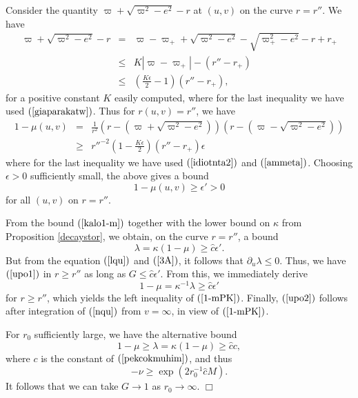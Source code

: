 \documentclass{article}
\begin{document}
Consider the quantity $\varpi+\sqrt{\varpi^2-e^2}-r$
at $(u,v)$ on the curve $r=r''$.
We have
\begin{eqnarray}
\nonumber
\label{ammeta}
\varpi+\sqrt{\varpi^2-e^2}-r	& = &	\varpi-\varpi_++\sqrt{\varpi^2-e^2}-\sqrt{\varpi_+^2-e^2}-r+r_+\\
				&\le&	K|\varpi-\varpi_+|-(r''-r_+)\\
				&\le&	\left(\frac{K\epsilon}2-1\right)(r''-r_+),
\end{eqnarray}
for a positive constant $K$ easily computed,
where for the last inequality we have used $(\ref{giaparakatw})$.
Thus for $r(u,v)=r''$, we have
\begin{eqnarray*}
1-\mu(u,v)	& = &	\frac{1}{r^2}\left(r-\left(\varpi+\sqrt{\varpi^2-e^2}\right)\right)
					\left(r-\left(\varpi-\sqrt{\varpi^2-e^2}\right)\right)\\
		&\ge&	r''^{-2}\left(1-\frac{K\epsilon}2\right)(r''-r_+)\epsilon
\end{eqnarray*}
where for the last inequality we have used $(\ref{idiotnta2})$ and $(\ref{ammeta})$.
Choosing $\epsilon>0$ sufficiently small, the above gives a bound
\begin{equation}
\label{kalo1-m}
1-\mu(u,v)\ge\epsilon'>0
\end{equation}
for all $(u,v)$ on $r=r''$.

From the bound $(\ref{kalo1-m})$ together 
with the lower bound on $\kappa$ from Proposition
\ref{decaystor},
we obtain, on the curve $r=r''$, a bound
\[
\lambda=\kappa(1-\mu)\ge\hat{c}\epsilon'.
\]
But from the equation $(\ref{lqu})$ and $(\ref{3A})$, it follows that $\partial_u\lambda\le0$.
Thus, we have
$(\ref{upo1})$ in $r\ge r''$ as long as $G\le\hat{c}\epsilon'$.
From this, we immediately derive
\[
1-\mu=\kappa^{-1}\lambda\ge\hat{c}\epsilon'
\]
for $r\ge r''$,
which yields the left inequality of $(\ref{1-mPK})$.
Finally, $(\ref{upo2})$ follows after integration of
$(\ref{nqu})$ from $v=\infty$, in view of $(\ref{1-mPK})$. 

For $r_0$ sufficiently large, we have the alternative bound
\[
1-\mu\ge\lambda=\kappa(1-\mu)\ge \hat{c}c,
\]
where $c$ is the constant of $(\ref{pekcokmuhim})$,
and thus
\[
-\nu\ge\exp(2r_0^{-1}\hat{c}M).
\]
It follows that we can take $G\to1$ as $r_0\to\infty$.
$\Box$
\end{document}
